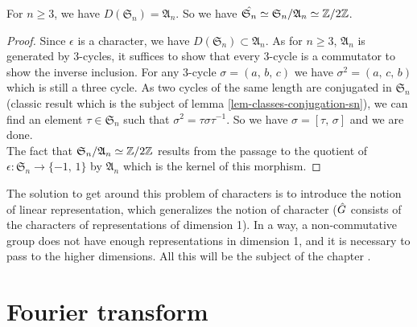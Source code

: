 \begin{prop}
 For $n \geq 3 $, we have $ D(\mathfrak{S}_n) = \mathfrak{A}_n $. So we have $\hat{\mathfrak{S}_n} \simeq \mathfrak{S}_n/\mathfrak{A}_n \simeq \mathbb{Z}/2 \mathbb{Z}$.
\end{prop}
\begin{proof}
Since $\epsilon $ is a character, we have $ D(\mathfrak{S}_n) \subset \mathfrak{A}_n $. As for $n \geq 3 $, $\mathfrak{A}_n $ is generated by 3-cycles, it suffices to show that every 3-cycle is a commutator to show the inverse inclusion. For any 3-cycle $\sigma = (a, \, b, \, c)$ we have $\sigma^2 = (a, \, c, \, b)$ which is still a three cycle. As two cycles of the same length are conjugated in $\mathfrak{S}_n $ (classic result which is the subject of lemma \ref{lem-classes-conjugation-sn}), we can find an element $\tau \in \mathfrak{S}_n $ such that $\sigma^2 = \tau \sigma \tau^{-1}$. So we have $\sigma = [\tau, \, \sigma]$ and we are done. \\The fact that $\mathfrak{S}_n/\mathfrak{A}_n \simeq \mathbb{Z}/2 \mathbb{Z}$ results from the passage to the quotient of $\epsilon: \mathfrak{S}_n \rightarrow \{- 1, \, 1\}$ by $\mathfrak{A}_n $ which is the kernel of this morphism.
\end{proof}

\begin{rem}
The solution to get around this problem of  characters is to introduce the notion of linear representation, which generalizes the notion of character ($\hat{G}$ consists of the characters of representations of dimension 1). In a way, a non-commutative group does not have enough representations in dimension 1, and it is necessary to pass to the higher dimensions. All this will be the subject of the chapter .
\end{rem}

\section{Fourier transform}
\label{sect1-transforme-fourier}

